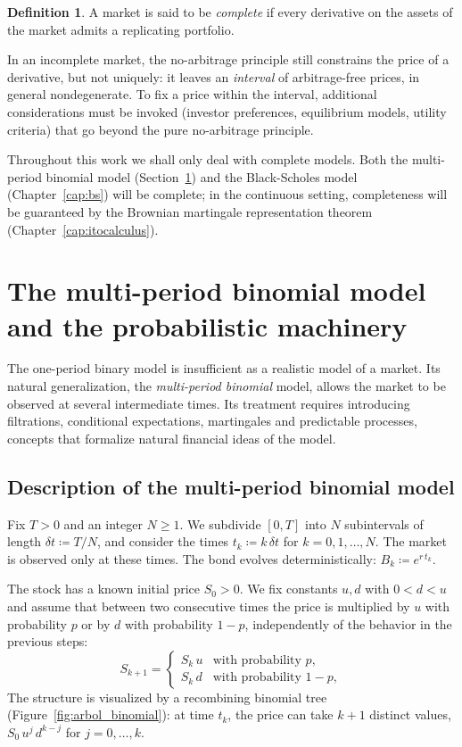 \documentclass[11pt,a4paper,oneside]{report}
\theoremstyle{plain}
\theoremstyle{definition}
\newtheorem{definicion}[teorema]{Definition}
\theoremstyle{remark}
\newcommand{\1}{\mathbf{1}}
\newcommand{\eqdef}{\coloneqq}
\begin{document}
\begin{definicion}
\label{def:completitud_preliminar}
A market is said to be \emph{complete} if every derivative on the
assets of the market admits a replicating portfolio.
\end{definicion}

In an incomplete market, the no-arbitrage principle still constrains
the price of a derivative, but not uniquely: it leaves an
\emph{interval} of arbitrage-free prices, in general nondegenerate. To
fix a price within the interval, additional considerations must be
invoked (investor preferences, equilibrium models, utility criteria)
that go beyond the pure no-arbitrage principle.

Throughout this work we shall only deal with complete models. Both the
multi-period binomial model (Section~\ref{sec:multiperiodo}) and the
Black-Scholes model (Chapter~\ref{cap:bs}) will be complete; in the
continuous setting, completeness will be guaranteed by the Brownian
martingale representation theorem (Chapter~\ref{cap:itocalculus}).
\section{The multi-period binomial model and the probabilistic machinery}
\label{sec:multiperiodo}

The one-period binary model is insufficient as a realistic model of a
market. Its natural generalization, the \emph{multi-period binomial}
model, allows the market to be observed at several intermediate times.
Its treatment requires introducing filtrations, conditional
expectations, martingales and predictable processes, concepts that
formalize natural financial ideas of the model.

\subsection{Description of the multi-period binomial model}
\label{subsec:setup_multiperiodo}

Fix $T > 0$ and
an integer $N \geq 1$. We subdivide $[0, T]$ into $N$ subintervals of
length $\delta t \eqdef T/N$, and consider the times
$t_k \eqdef k\, \delta t$ for $k = 0, 1, \ldots, N$. The market is
observed only at these times. The bond evolves deterministically:
$B_k \eqdef e^{r\, t_k}$.

The stock has a known
initial price $S_0 > 0$. We fix constants $u, d$ with $0 < d < u$ and
assume that between two consecutive times the price is multiplied by
$u$ with probability $p$ or by $d$ with probability $1-p$,
independently of the behavior in the previous steps:
\begin{equation*}
  S_{k+1} = \begin{cases}
    S_k\, u & \text{with probability } p, \\[2pt]
    S_k\, d & \text{with probability } 1 - p,
  \end{cases}
\end{equation*}
The structure is visualized by a recombining binomial tree
(Figure~\ref{fig:arbol_binomial}): at time $t_k$, the price can take
$k+1$ distinct values, $S_0\, u^j\, d^{k-j}$ for $j = 0, \ldots, k$.
\end{document}
